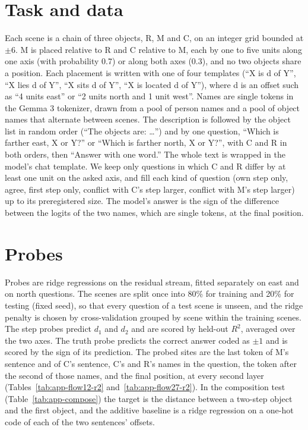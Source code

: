 
\section{Task and data}\label{app:data}
Each scene is a chain of three objects, R, M and C, on an integer grid bounded at $\pm 6$. M is placed relative to R
and C relative to M, each by one to five units along one axis (with probability 0.7) or along both axes (0.3), and no
two objects share a position. Each placement is written with one of four templates (``X is d of Y'', ``X lies d of
Y'', ``X sits d of Y'', ``X is located d of Y''), where d is an offset such as ``4 units east'' or ``2 units north and
1 unit west''. Names are single tokens in the Gemma 3 tokenizer, drawn from a pool of person names and a pool of object
names that alternate between scenes. The description is followed by the object list in random order (``The objects
are: \dots'') and by one question, ``Which is farther east, X or Y?'' or ``Which is farther north, X or Y?'', with C and
R in both orders, then ``Answer with one word.'' The whole text is wrapped in the model's chat template. We keep only
questions in which C and R differ by at least one unit on the asked axis, and fill each kind of question (own step only,
agree, first step only, conflict with C's step larger, conflict with M's step larger) up to its preregistered size. The
model's answer is the sign of the difference between the logits of the two names, which are single tokens, at the
final position.

\section{Probes}\label{app:probes}
Probes are ridge regressions on the residual stream, fitted separately on east and on north questions. The scenes are
split once into 80\% for training and 20\% for testing (fixed seed), so that every question of a test scene is
unseen, and the ridge penalty is chosen by cross-validation grouped by scene within the training scenes. The step
probes predict $d_1$ and $d_2$ and are scored by held-out $R^2$, averaged over the two axes. The truth probe predicts
the correct answer coded as $\pm 1$ and is scored by the sign of its prediction. The probed sites are the last token of
M's sentence and of C's sentence, C's and R's names in the question, the token after the second of those names, and the
final position, at every second layer (Tables~\ref{tab:app-flow12-r2} and~\ref{tab:app-flow27-r2}). In the
composition test (Table~\ref{tab:app-compose}) the target is the distance between a two-step object and the first
object, and the additive baseline is a ridge regression on a one-hot code of each of the two sentences' offsets.

